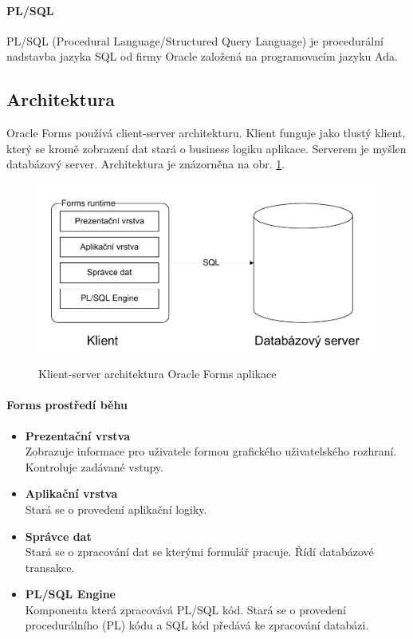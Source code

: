 \documentclass{diplomka}
\begin{document}
\paragraph{PL/SQL}
PL/SQL (Procedural Language/Structured Query Language) je procedurální nadstavba jazyka SQL od firmy Oracle založená na programovacím jazyku Ada.
\newpage
\subsection{Architektura}
Oracle Forms používá client-server architekturu. Klient funguje jako tlustý klient, který se kromě zobrazení dat stará o business logiku aplikace. Serverem je myšlen databázový server. Architektura je znázorněna na obr. \ref{fig:arch}.

\begin{figure}[H]
  \centering
  \includegraphics[scale=0.7]{visio/arch.pdf}
\caption{Klient-server architektura Oracle Forms aplikace}
\label{fig:arch}
\end{figure}
\paragraph{Forms prostředí běhu}
\begin{itemize}[noitemsep,nolistsep]
\item \textbf{Prezentační vrstva}\\
Zobrazuje informace pro uživatele formou grafického uživatelského rozhraní. Kontroluje zadávané vstupy.
\item \textbf{Aplikační vrstva}\\
Stará se o provedení aplikační logiky.
\item \textbf{Správce dat}\\
Stará se o zpracování dat se kterými formulář pracuje. Řídí databázové transakce.
\item \textbf{PL/SQL Engine}\\
Komponenta která zpracovává PL/SQL kód. Stará se o provedení procedurálního (PL) kódu a SQL kód předává ke zpracování databázi.
\end{itemize}
\end{document}
